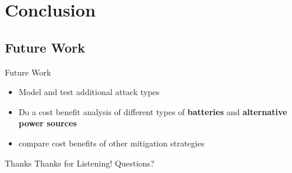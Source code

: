 \documentclass{beamer}
\begin{document}
\section{Conclusion}

\subsection{Future Work}
\begin{frame}{Future Work}
\begin{itemize}

	\item Model and test additional attack types 
	\item Do a cost benefit analysis of different types of \textbf{batteries} and \textbf{alternative power sources}
	\item compare cost benefits of other mitigation strategies 

\end{itemize}
\end{frame}	

\begin{frame}{Thanks}
	\centering
	\huge{Thanks for Listening! Questions?}
\end{frame}
\end{document}
